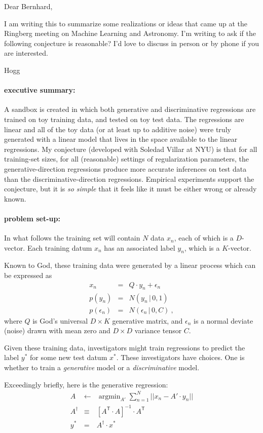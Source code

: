 \documentclass[12pt]{article}
\newcommand{\given}{\,|\,}
\newcommand{\T}{^{{\mathsf T}}}
\newcommand{\inv}{^{-1}}
\DeclareMathOperator*{\argmin}{argmin}
\begin{document}
\noindent
Dear Bernhard,

I am writing this to summarize some realizations or ideas that came up
at the Ringberg meeting on Machine Learning and Astronomy. I'm writing
to ask if the following conjecture is reasonable? I'd love to discuss
in person or by phone if you are interested.

Hogg

\paragraph{executive summary:}
A sandbox is created in which both generative and discriminative
regressions are trained on toy training data, and tested on toy test
data.
The regressions are linear and all of the toy data (or at least up to
additive noise) were truly generated with a linear model that lives in
the space available to the linear regressions.
My conjecture (developed with Soledad Villar at NYU) is that for all
training-set sizes, for all (reasonable) settings of regularization parameters,
the generative-direction regressions produce more accurate inferences on
test data than the discriminative-direction regressions.
Empirical experiments support the conjecture, but it is \emph{so simple}
that it feels like it must be either wrong or already known.

\paragraph{problem set-up:}
In what follows the training set will contain $N$ data $x_n$, each of
which is a $D$-vector.
Each training datum $x_n$ has an associated label $y_n$, which is a
$K$-vector.

Known to God, these training data were generated by a linear process
which can be expressed as
\begin{eqnarray}
x_n &=& Q \cdot y_n + \epsilon_n \\
p(y_n) &=& N(y_n\given 0, 1) \\
p(\epsilon_n) &=& N(\epsilon_n\given 0, C)
~,
\end{eqnarray}
where $Q$ is God's universal $D\times K$ generative matrix, and
$\epsilon_n$ is a normal deviate (noise) drawn with mean zero and
$D\times D$ variance tensor $C$.

Given these training data, investigators might train regressions to
predict the label $y^\ast$ for some new test datum $x^\ast$.
These investigators have choices.
One is whether to train a \emph{generative} model or a
\emph{discriminative} model.

Exceedingly briefly, here is the generative regression:
\begin{eqnarray}
A &\leftarrow& \argmin_{A'} \sum_{n=1}^N ||x_n - A'\cdot y_n|| \\
A^\dagger &\equiv& [A\T\cdot A]\inv \cdot A\T \\
y^\ast &=& A^\dagger\cdot x^\ast
\end{eqnarray}
\end{document}
